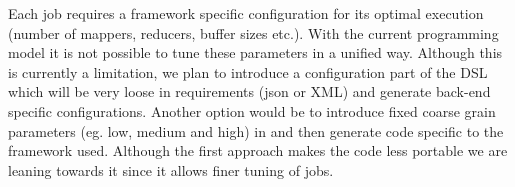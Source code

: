 Each job requires a framework specific configuration for its optimal execution (number of mappers, reducers, buffer sizes etc.). With the current programming model it is not possible to tune these parameters in a unified way. Although this is currently a limitation, we plan to introduce a configuration part of the DSL which will be very loose in requirements (json or XML) and generate back-end specific configurations. Another option would be to introduce fixed coarse grain parameters (eg. low, medium and high) in \tool and then generate code specific to the framework used. Although the first approach makes the code less portable we are leaning towards it since it allows finer tuning of jobs.